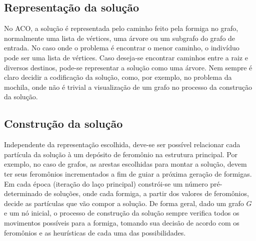 \subsection{Representação da solução}
No ACO, a solução é representada pelo caminho feito pela formiga no grafo, normalmente uma lista de vértices, uma árvore ou um subgrafo do grafo de entrada. No caso onde o problema é encontrar o menor caminho, o indivíduo pode ser uma lista de vértices. Caso deseja-se encontrar caminhos entre a raiz e diversos destinos, pode-se representar a solução como uma árvore. Nem sempre é claro decidir a codificação da solução, como, por exemplo, no problema da mochila, onde não é trivial a visualização de um grafo no processo da construção da solução.

\subsection{Construção da solução}
Independente da representação escolhida, deve-se ser possível relacionar cada partícula da solução à um depósito de feromônio na estrutura principal. Por exemplo, no caso de grafos, as arestas escolhidas para montar a solução, devem ter seus feromônios incrementados a fim de guiar a próxima geração de formigas. Em cada época (iteração do laço principal) constrói-se um número pré-determinado de soluções, onde cada formiga, a partir dos valores de feromônios, decide as partículas que vão compor a solução. De forma geral, dado um grafo $G$ e um nó inicial, o processo de construção da solução sempre verifica todos os movimentos possíveis para a formiga, tomando sua decisão de acordo com os feromônios e as heurísticas de cada uma das possibilidades. 

